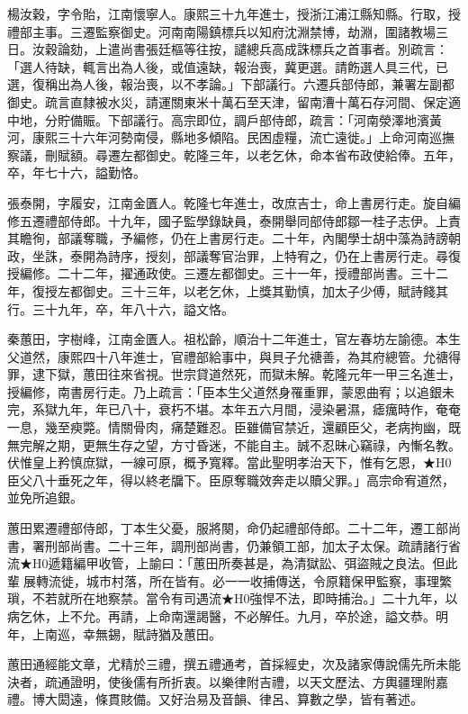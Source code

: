 \begin{pinyinscope}
楊汝穀，字令貽，江南懷寧人。康熙三十九年進士，授浙江浦江縣知縣。行取，授禮部主事。三遷監察御史。河南南陽鎮標兵以知府沈淵禁博，劫淵，圍諸教場三日。汝穀論劾，上遣尚書張廷樞等往按，譴總兵高成誅標兵之首事者。別疏言：「選人待缺，輒言出為人後，或值遠缺，報治喪，冀更選。請飭選人具三代，已選，復稱出為人後，報治喪，以不孝論。」下部議行。六遷兵部侍郎，兼署左副都御史。疏言直隸被水災，請運關東米十萬石至天津，留南漕十萬石存河間、保定適中地，分貯備賑。下部議行。高宗即位，調戶部侍郎，疏言：「河南滎澤地濱黃河，康熙三十六年河勢南侵，縣地多傾陷。民困虛糧，流亡遠徙。」上命河南巡撫察議，刪賦額。尋遷左都御史。乾隆三年，以老乞休，命本省布政使給俸。五年，卒，年七十六，謚勤恪。

張泰開，字履安，江南金匱人。乾隆七年進士，改庶吉士，命上書房行走。旋自編修五遷禮部侍郎。十九年，國子監學錄缺員，泰開舉同部侍郎鄒一桂子志伊。上責其瞻徇，部議奪職，予編修，仍在上書房行走。二十年，內閣學士胡中藻為詩謗朝政，坐誅，泰開為詩序，授刻，部議奪官治罪，上特宥之，仍在上書房行走。尋復授編修。二十二年，擢通政使。三遷左都御史。三十一年，授禮部尚書。三十二年，復授左都御史。三十三年，以老乞休，上獎其勤慎，加太子少傅，賦詩餞其行。三十九年，卒，年八十六，謚文恪。

秦蕙田，字樹峰，江南金匱人。祖松齡，順治十二年進士，官左春坊左諭德。本生父道然，康熙四十八年進士，官禮部給事中，與貝子允禟善，為其府總管。允禟得罪，逮下獄，蕙田往來省視。世宗貸道然死，而獄未解。乾隆元年一甲三名進士，授編修，南書房行走。乃上疏言：「臣本生父道然身罹重罪，蒙恩曲宥；以追銀未完，系獄九年，年已八十，衰朽不堪。本年五六月間，浸染暑濕，瘧癘時作，奄奄一息，幾至瘐斃。情關骨肉，痛楚難忍。臣雖備官禁近，還顧臣父，老病拘幽，既無完解之期，更無生存之望，方寸昏迷，不能自主。誠不忍昧心竊祿，內慚名教。伏惟皇上矜慎庶獄，一線可原，概予寬釋。當此聖明孝治天下，惟有乞恩，★H0臣父八十垂死之年，得以終老牖下。臣原奪職效奔走以贖父罪。」高宗命宥道然，並免所追銀。

蕙田累遷禮部侍郎，丁本生父憂，服將闋，命仍起禮部侍郎。二十二年，遷工部尚書，署刑部尚書。二十三年，調刑部尚書，仍兼領工部，加太子太保。疏請諸行省流★H0遞籍編甲收管，上諭曰：「蕙田所奏甚是，為清獄訟、弭盜賊之良法。但此輩展轉流徙，城市村落，所在皆有。必一一收捕傳送，令原籍保甲監察，事理繁瑣，不若就所在地察禁。當令有司遇流★H0強悍不法，即時捕治。」二十九年，以病乞休，上不允。再請，上命南還謁醫，不必解任。九月，卒於途，謚文恭。明年，上南巡，幸無錫，賦詩猶及蕙田。

蕙田通經能文章，尤精於三禮，撰五禮通考，首採經史，次及諸家傳說儒先所未能決者，疏通證明，使後儒有所折衷。以樂律附吉禮，以天文歷法、方輿疆理附嘉禮。博大閎遠，條貫賅備。又好治易及音韻、律呂、算數之學，皆有著述。


\end{pinyinscope}
